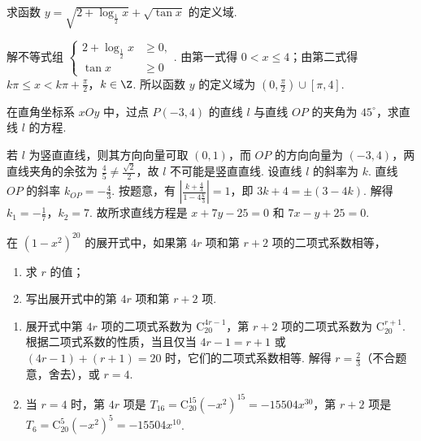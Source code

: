 \documentclass[UTF8,a4paper,oneside,11pt]{ctexbook}
\begin{document}
\begin{problem}
求函数 \(y=\sqrt{2+\log_{\frac{1}{2}}x}+\sqrt{\tan x}\) 的定义域.
\end{problem}

\begin{solution}
解不等式组 \(\left\{\begin{aligned}2+\log_{\frac{1}{2}}x&\geqslant 0,\\ \tan x&\geqslant 0\end{aligned}\right.\). 由第一式得 \(0<x\leqslant 4\)；由第二式得 \(k\pi\leqslant x<k\pi+\frac{\pi}{2}\)，\(k\in\Z\). 所以函数 \(y\) 的定义域为 \(\left( 0,\frac{\pi}{2} \right)\cup [\pi,4]\).
\end{solution}

\begin{problem}
在直角坐标系 \(xOy\) 中，过点 \(P(-3,4)\) 的直线 \(l\) 与直线 \(OP\) 的夹角为 \(45^\circ\)，求直线 \(l\) 的方程.
\end{problem}

\begin{solution}
若 \(l\) 为竖直直线，则其方向向量可取 \((0,1)\)，而 \(OP\) 的方向向量为 \((-3,4)\)，两直线夹角的余弦为 \(\frac{4}{5}\ne\frac{\sqrt{2}}{2}\)，故 \(l\) 不可能是竖直直线. 设直线 \(l\) 的斜率为 \(k\). 直线 \(OP\) 的斜率 \(k_{OP}=-\frac{4}{3}\). 按题意，有 \(\left| \frac{k+\frac{4}{3}}{1-4\frac{k}{3}} \right|=1\)，即 \(3k+4=\pm(3-4k)\). 解得 \(k_1=-\frac{1}{7}\)，\(k_2=7\). 故所求直线方程是 \(x+7y-25=0\) 和 \(7x-y+25=0\).
\end{solution}

\begin{problem}
在 \((1-x^2)^{20}\) 的展开式中，如果第 \(4r\) 项和第 \(r+2\) 项的二项式系数相等，
\begin{enumerate}
\item 求 \(r\) 的值；
\item 写出展开式中的第 \(4r\) 项和第 \(r+2\) 项.
\end{enumerate}
\end{problem}

\begin{solution}
\begin{enumerate}
\item 展开式中第 \(4r\) 项的二项式系数为 \(\mathrm C_{20}^{4r-1}\)，第 \(r+2\) 项的二项式系数为 \(\mathrm C_{20}^{r+1}\). 根据二项式系数的性质，当且仅当 \(4r-1=r+1\) 或 \((4r-1)+(r+1)=20\) 时，它们的二项式系数相等. 解得 \(r=\frac{2}{3}\)（不合题意，舍去），或 \(r=4\).
\item 当 \(r=4\) 时，第 \(4r\) 项是 \(T_{16}=\mathrm C_{20}^{15}\left( -x^2 \right)^{15}=-15504x^{30}\)，第 \(r+2\) 项是 \(T_6=\mathrm C_{20}^5\left( -x^2 \right)^5=-15504x^{10}\).
\end{enumerate}
\end{solution}
\end{document}
